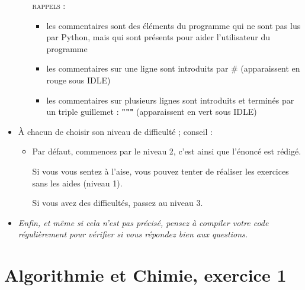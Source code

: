 \documentclass[11pt]{article}
\begin{document}
\begin{itemize}
\begin{itemize}
 \textsc{rappels : }
 \begin{itemize}
  \item les commentaires sont des éléments du programme qui ne sont pas lus par Python, mais qui sont présents pour aider l'utilisateur du programme
  \item les commentaires sur une ligne sont introduits par \# (apparaissent en rouge sous IDLE)
  \item les commentaires sur plusieurs lignes sont introduits et terminés par un triple guillemet : \textbf{"""} (apparaissent en vert sous IDLE)
 \end{itemize}
 
\end{itemize}


\medskip
\item À chacun de choisir son niveau de difficulté ; conseil : 

\begin{itemize}
 \item Par défaut, commencez par le niveau 2, c'est ainsi que l'énoncé est rédigé. 
 
 Si vous vous sentez à l'aise, vous pouvez tenter de réaliser les exercices sans les aides (niveau 1).
 
 Si vous avez des difficultés, passez au niveau 3.
\end{itemize}


\smallskip
\item \textit{Enfin, et même si cela n'est pas précisé, pensez à compiler votre code régulièrement pour vérifier si vous répondez bien aux questions.}

\end{itemize}











\newpage

\section{Algorithmie et Chimie, exercice 1}
\end{document}
